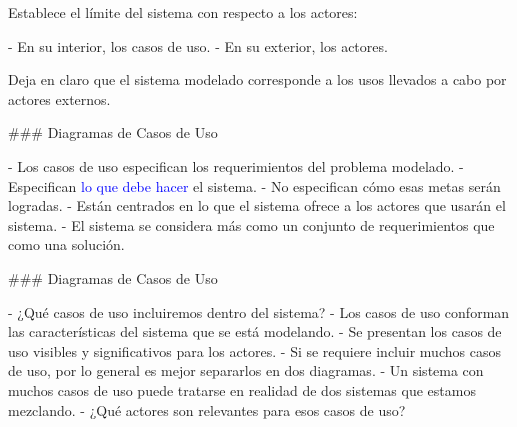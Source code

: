  Establece el límite del sistema con respecto a los actores:

- En su interior, los casos de uso.
- En su exterior, los actores.

Deja en claro que el sistema modelado corresponde a los usos llevados a cabo por actores externos.

\columnsend

### Diagramas de Casos de Uso

\newline

- Los casos de uso especifican los requerimientos del problema modelado.
- Especifican \textcolor{blue}{lo que debe hacer} el sistema.
- No especifican cómo esas metas serán logradas.
- Están centrados en lo que el sistema ofrece a los actores que usarán el sistema.
- El sistema se considera más como un conjunto de requerimientos que como una solución.

### Diagramas de Casos de Uso

\newline

- ¿Qué casos de uso incluiremos dentro del sistema?
    - Los casos de uso conforman las características del sistema que se está modelando.
    - Se presentan los casos de uso visibles y significativos para los actores.
    - Si se requiere incluir muchos casos de uso, por lo general es mejor separarlos en dos diagramas.
    - Un sistema con muchos casos de uso puede tratarse en realidad de dos sistemas que estamos mezclando.
- ¿Qué actores son relevantes para esos casos de uso?

